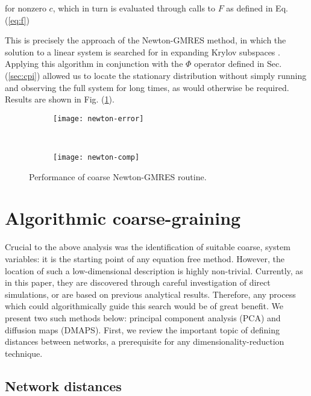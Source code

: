 \documentclass[epjST, final]{svjour}
\begin{document}
\begin{onehalfspace}
for nonzero $c$, which in turn is evaluated through calls to $F$ as defined in Eq. (\ref{eq:f})

This is precisely the approach of the Newton-GMRES method, in which the solution to a linear system is searched for in expanding Krylov subspaces \cite{kelley_solving_2003}. Applying this algorithm in conjunction with the $\Phi$ operator defined in Sec. (\ref{sec:cpi}) allowed us to locate the stationary distribution without simply running and observing the full system for long times, as would otherwise be required. Results are shown in Fig. (\ref{fig:newton-results}).

\begin{figure}[h!]
  \vspace{-5mm}
  \centering
  \begin{subfigure}{0.75\textwidth}
    \centering
    \texttt{[image: newton-error]}
  \end{subfigure} \\ %
  \begin{subfigure}{0.75\textwidth}
    \centering
    \texttt{[image: newton-comp]}
  \end{subfigure}%
  \caption{Performance of coarse Newton-GMRES routine. \label{fig:newton-results}}
\end{figure}


\section{Algorithmic coarse-graining}
\label{sec:dr}
Crucial to the above analysis was the identification of suitable coarse, system variables: it is the starting point of any equation free method. However, the location of such a low-dimensional description is highly non-trivial. Currently, as in this paper, they are discovered through careful investigation of direct simulations, or are based on previous analytical results. Therefore, any process which could algorithmically guide this search would be of great benefit. We present two such methods below: principal component analysis (PCA) and diffusion maps (DMAPS). First, we review the important topic of defining distances between networks, a prerequisite for any dimensionality-reduction technique.

\subsection{Network distances}


\end{onehalfspace}
\end{document}
